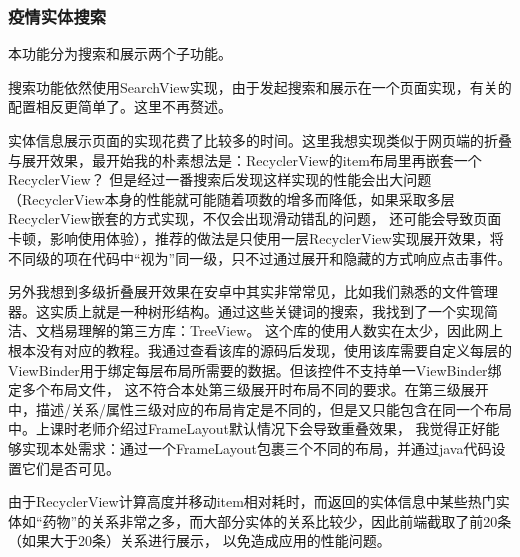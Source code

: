 \documentclass[UTF8]{article}
\begin{document}

    \newpage
\subsubsection{疫情实体搜索}
本功能分为搜索和展示两个子功能。

搜索功能依然使用SearchView实现，由于发起搜索和展示在一个页面实现，有关的配置相反更简单了。这里不再赘述。

实体信息展示页面的实现花费了比较多的时间。这里我想实现类似于网页端的折叠与展开效果，最开始我的朴素想法是：RecyclerView的item布局里再嵌套一个RecyclerView？
但是经过一番搜索后发现这样实现的性能会出大问题（RecyclerView本身的性能就可能随着项数的增多而降低，如果采取多层RecyclerView嵌套的方式实现，不仅会出现滑动错乱的问题，
还可能会导致页面卡顿，影响使用体验），推荐的做法是只使用一层RecyclerView实现展开效果，将不同级的项在代码中“视为”同一级，只不过通过展开和隐藏的方式响应点击事件。

另外我想到多级折叠展开效果在安卓中其实非常常见，比如我们熟悉的文件管理器。这实质上就是一种树形结构。通过这些关键词的搜索，我找到了一个实现简洁、文档易理解的第三方库：TreeView。
这个库的使用人数实在太少，因此网上根本没有对应的教程。我通过查看该库的源码后发现，使用该库需要自定义每层的ViewBinder用于绑定每层布局所需要的数据。但该控件不支持单一ViewBinder绑定多个布局文件，
这不符合本处第三级展开时布局不同的要求。在第三级展开中，描述/关系/属性三级对应的布局肯定是不同的，但是又只能包含在同一个布局中。上课时老师介绍过FrameLayout默认情况下会导致重叠效果，
我觉得正好能够实现本处需求：通过一个FrameLayout包裹三个不同的布局，并通过java代码设置它们是否可见。

由于RecyclerView计算高度并移动item相对耗时，而返回的实体信息中某些热门实体如“药物”的关系非常之多，而大部分实体的关系比较少，因此前端截取了前20条（如果大于20条）关系进行展示，
以免造成应用的性能问题。
\end{document}
